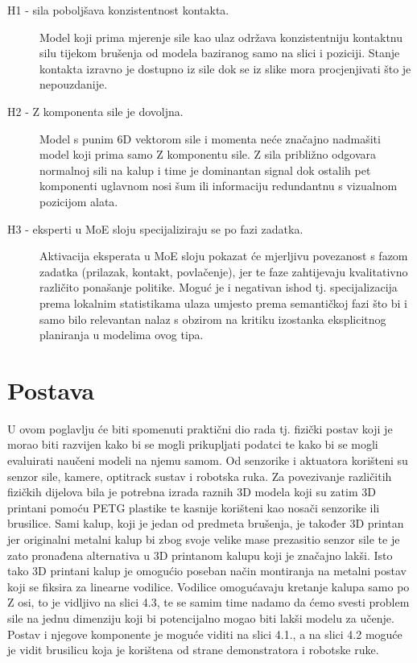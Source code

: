\documentclass[times, utf8, diplomski]{fer}
\begin{document}
\begin{description}
    \item[H1 - sila poboljšava konzistentnost kontakta.] Model koji prima mjerenje sile kao ulaz održava konzistentniju kontaktnu silu tijekom brušenja od modela baziranog samo na slici i poziciji. Stanje kontakta izravno je dostupno iz sile dok se iz slike mora procjenjivati što je nepouzdanije.

    \item[H2 - Z komponenta sile je dovoljna.] Model s punim 6D vektorom sile i momenta neće značajno nadmašiti model koji prima samo Z komponentu sile. Z sila približno odgovara normalnoj sili na kalup i time je dominantan signal dok ostalih pet komponenti uglavnom nosi šum ili informaciju redundantnu s vizualnom pozicijom alata.

    \item[H3 - eksperti u MoE sloju specijaliziraju se po fazi zadatka.] Aktivacija eksperata u MoE sloju pokazat će mjerljivu povezanost s fazom zadatka (prilazak, kontakt, povlačenje), jer te faze zahtijevaju kvalitativno različito ponašanje politike. Moguć je i negativan ishod tj. specijalizacija prema lokalnim statistikama ulaza umjesto prema semantičkoj fazi što bi i samo bilo relevantan nalaz s obzirom na kritiku izostanka eksplicitnog planiranja u modelima ovog tipa.
\end{description}

\chapter{Postava}

U ovom poglavlju će biti spomenuti praktični dio rada tj. fizički postav koji je morao biti razvijen kako bi se mogli prikupljati podatci te kako bi se mogli evaluirati naučeni modeli na njemu samom. Od senzorike i aktuatora korišteni su senzor sile, kamere, optitrack sustav i robotska ruka. Za povezivanje različitih fizičkih dijelova bila je potrebna izrada raznih 3D modela koji su zatim 3D printani pomoću PETG plastike te kasnije korišteni kao nosači senzorike ili brusilice. Sami kalup, koji je jedan od predmeta brušenja, je također 3D printan jer originalni metalni kalup bi zbog svoje velike mase prezasitio senzor sile te je zato pronađena alternativa u 3D printanom kalupu koji je značajno lakši. Isto tako 3D printani kalup je omogućio poseban način montiranja na metalni postav koji se fiksira za linearne vodilice. Vodilice omogućavaju kretanje kalupa samo po Z osi, to je vidljivo na slici 4.3, te se samim time nadamo da ćemo svesti problem sile na jednu dimenziju koji bi potencijalno mogao biti lakši modelu za učenje. Postav i njegove komponente je moguće viditi na slici 4.1., a na slici 4.2 moguće je vidit brusilicu koja je korištena od strane demonstratora i robotske ruke.
\end{document}
